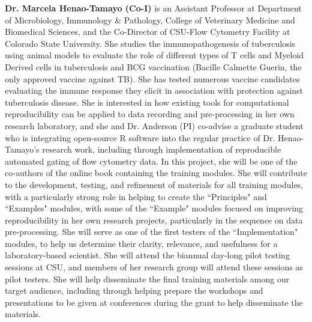 \documentclass[pdftex,english,11pt,parskip=half]{scrartcl}
\begin{document}
\noindent \textbf{Dr. Marcela Henao-Tamayo (Co-I)} is an Assistant Professor at
Department of Microbiology, Immunology \& Pathology, College of Veterinary
Medicine and Biomedical Sciences, and the Co-Director of CSU-Flow Cytometry
Facility at Colorado State University. She studies the immunopathogenesis of
tuberculosis using animal models to evaluate the role of different types of T
cells and Myeloid Derived cells in tuberculosis and BCG vaccination (Bacille
Calmette Guerin, the only approved vaccine against TB). She has tested numerous
vaccine candidates evaluating the immune response they elicit in association
with protection against tuberculosis disease. She is interested in how existing
tools for computational reproducibility can be applied to data recording and
pre-processing in her own research laboratory, and she and Dr. Anderson (PI)
co-advise a graduate student who is integrating open-source R software into the
regular practice of Dr. Henao-Tamayo's research work, including through
implementation of reproducible automated gating of flow cytometry data. In this
project, she will be one of the co-authors of the online book containing the
training modules. She will contribute to the development, testing, and
refinement of materials for all training modules, with a particularly strong
role in helping to create the ``Principles" and ``Examples" modules, with some
of the ``Example" modules focused on improving reproducibility in her own
research projects, particularly in the sequence on data pre-processing. She will
serve as one of the first testers of the ``Implementation" modules, to help us
determine their clarity, relevance, and usefulness for a laboratory-based
scientist. She will attend the biannual day-long pilot testing sessions at CSU,
and members of her research group will attend these sessions as pilot testers.
She will help disseminate the final training materials among our target
audience, including through helping prepare the workshops and presentations to
be given at conferences during the grant to help disseminate the materials. 
\end{document}
